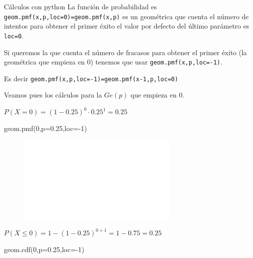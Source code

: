 \documentclass[
  ignorenonframetext,
  aspectratio=169]{beamer}
\newenvironment{Shaded}{\begin{snugshade}}{\end{snugshade}}
\newcommand{\DecValTok}[1]{\textcolor[rgb]{0.68,0.00,0.00}{#1}}
\newcommand{\FloatTok}[1]{\textcolor[rgb]{0.68,0.00,0.00}{#1}}
\newcommand{\NormalTok}[1]{\textcolor[rgb]{0.00,0.23,0.31}{#1}}
\newcommand{\OperatorTok}[1]{\textcolor[rgb]{0.37,0.37,0.37}{#1}}
\begin{document}
\begin{frame}[fragile]{Cálculos con python}
\protect\hypertarget{cuxe1lculos-con-python-1}{}
La función de probabilidad es \texttt{geom.pmf(x,p,loc=0)=geom.pmf(x,p)}
es un geométrica que cuenta el número de intentos para obtener el primer
éxito el valor por defecto del último parámetro es \texttt{loc=0}.

Si queremos la que cuenta el número de fracasos para obtener el primer
éxito (la geométrica que empieza en 0) tenemos que usar
\texttt{geom.pmf(x,p,loc=-1)}.

Es decir \texttt{geom.pmf(x,p,loc=-1)=geom.pmf(x-1,p,loc=0)}

Veamos pues los cálculos para la \(Ge(p)\) que empieza en \(0\).

\(P(X=0)=(1-0.25)^0\cdot 0.25^1=0.25\)

\begin{Shaded}
\begin{Highlighting}[]
\NormalTok{geom.pmf(}\DecValTok{0}\NormalTok{,p}\OperatorTok{=}\FloatTok{0.25}\NormalTok{,loc}\OperatorTok{={-}}\DecValTok{1}\NormalTok{)}
\end{Highlighting}
\end{Shaded}

\begin{figure}

{\centering \includegraphics[width=0.7\textwidth,height=\textheight]{Tema_3_1_Notables_files/figure-beamer/py_geom_funciones1-3.pdf}

}

\end{figure}

\(P(X\leq 0)=1- (1-0.25)^{0+1}=1-0.75=0.25\)

\begin{Shaded}
\begin{Highlighting}[]
\NormalTok{geom.cdf(}\DecValTok{0}\NormalTok{,p}\OperatorTok{=}\FloatTok{0.25}\NormalTok{,loc}\OperatorTok{={-}}\DecValTok{1}\NormalTok{)}
\end{Highlighting}
\end{Shaded}


\end{frame}
\end{document}
